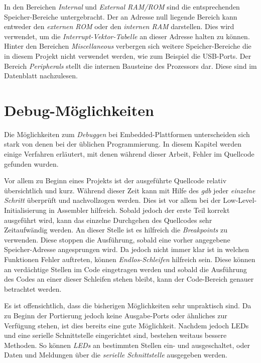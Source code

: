 \documentclass[
  a4paper,					%
  twoside,
  DIV=calc,     				%
  bibliography=totoc,
  cleardoublepage=empty,
  ngerman,     					%
  final       					%
]{scrbook}
\begin{document}
In den Bereichen \emph{Internal} und \emph{External RAM/ROM} sind die entsprechenden Speicher-Bereiche untergebracht. Der an Adresse null liegende Bereich kann entweder den \emph{externen ROM} oder den \emph{internen RAM} darstellen. Dies wird verwendet, um die \emph{Interrupt-Vektor-Tabelle} an dieser Adresse halten zu können. Hinter den Bereichen \emph{Miscellaneous} verbergen sich weitere Speicher-Bereiche die in diesem Projekt nicht verwendet werden, wie zum Beispiel die USB-Ports. Der Bereich \emph{Peripherals} stellt die internen Bausteine des Prozessors dar. Diese sind im Datenblatt\cite{manualat91rm9200} nachzulesen.



\section{Debug-Möglichkeiten}
\label{sec:debug}
Die Möglichkeiten zum \emph{Debuggen} bei Embedded-Plattformen unterscheiden sich stark von denen bei der üblichen Programmierung. In diesem Kapitel werden einige Verfahren erläutert, mit denen während dieser Arbeit, Fehler im Quellcode gefunden wurden.

Vor allem zu Beginn eines Projekts ist der ausgeführte Quellcode relativ übersichtlich und kurz. Während dieser Zeit kann mit Hilfe des \emph{gdb} jeder \emph{einzelne Schritt} überprüft und nachvollzogen werden. Dies ist vor allem bei der Low-Level-Initialisierung in Assembler hilfreich. Sobald jedoch der erste Teil korrekt ausgeführt wird, kann das einzelne Durchgehen des Quellcodes sehr Zeitaufwändig werden. An dieser Stelle ist es hilfreich die \emph{Breakpoints} zu verwenden. Diese stoppen die Ausführung, sobald eine vorher angegebene Speicher-Adresse angesprungen wird. Da jedoch nicht immer klar ist in welchen Funktionen Fehler auftreten, können \emph{Endlos-Schleifen} hilfreich sein. Diese können an verdächtige Stellen im Code eingetragen werden und sobald die Ausführung des Codes an einer dieser Schleifen stehen bleibt, kann der Code-Bereich genauer betrachtet werden.

Es ist offensichtlich, dass die bisherigen Möglichkeiten sehr unpraktisch sind. Da zu Beginn der Portierung jedoch keine Ausgabe-Ports oder ähnliches zur Verfügung stehen, ist dies bereits eine gute Möglichkeit. Nachdem jedoch LEDs und eine serielle Schnittstelle eingerichtet sind, bestehen weitaus bessere Methoden. So können \emph{LEDs} an bestimmten Stellen ein- und ausgeschaltet, oder Daten und Meldungen über die \emph{serielle Schnittstelle} ausgegeben werden.
\end{document}
